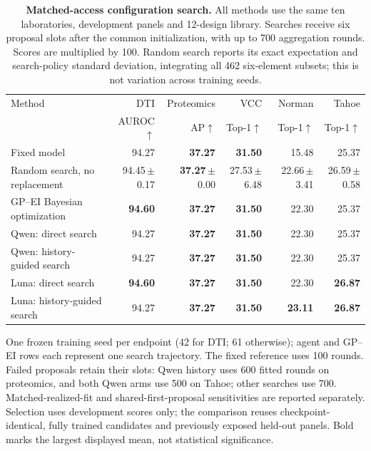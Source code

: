 \begin{table}[t]
\centering
\caption{\textbf{Matched-access configuration search.} All methods use the same ten laboratories, development panels and 12-design library. Searches receive six proposal slots after the common initialization, with up to 700 aggregation rounds. Scores are multiplied by 100. Random search reports its exact expectation and search-policy standard deviation, integrating all 462 six-element subsets; this is not variation across training seeds.}
\label{tab:rebuttal-matched-search}
\small
\setlength{\tabcolsep}{4pt}
\begin{tabular}{lrrrrr}
\toprule
Method & DTI & Proteomics & VCC & Norman & Tahoe \\
 & AUROC$\uparrow$ & AP$\uparrow$ & Top-1$\uparrow$ & Top-1$\uparrow$ & Top-1$\uparrow$ \\
\midrule
Fixed model & 94.27 & \textbf{37.27} & \textbf{31.50} & 15.48 & 25.37 \\
Random search, no replacement & 94.45\,{\scriptsize$\pm$}0.17 & \textbf{37.27}\,{\scriptsize$\pm$}0.00 & 27.53\,{\scriptsize$\pm$}6.48 & 22.66\,{\scriptsize$\pm$}3.41 & 26.59\,{\scriptsize$\pm$}0.58 \\
GP--EI Bayesian optimization & \textbf{94.60} & \textbf{37.27} & \textbf{31.50} & 22.30 & 25.37 \\
Qwen: direct search & 94.27 & \textbf{37.27} & \textbf{31.50} & 22.30 & 25.37 \\
Qwen: history-guided search & 94.27 & \textbf{37.27} & \textbf{31.50} & 22.30 & 25.37 \\
Luna: direct search & \textbf{94.60} & \textbf{37.27} & \textbf{31.50} & 22.30 & \textbf{26.87} \\
Luna: history-guided search & 94.27 & \textbf{37.27} & \textbf{31.50} & \textbf{23.11} & \textbf{26.87} \\
\bottomrule
\end{tabular}
\vspace{2pt}
\begin{minipage}{\linewidth}\footnotesize
One frozen training seed per endpoint (42 for DTI; 61 otherwise); agent and GP--EI rows each represent one search trajectory. The fixed reference uses 100 rounds. Failed proposals retain their slots: Qwen history uses 600 fitted rounds on proteomics, and both Qwen arms use 500 on Tahoe; other searches use 700. Matched-realized-fit and shared-first-proposal sensitivities are reported separately. Selection uses development scores only; the comparison reuses checkpoint-identical, fully trained candidates and previously exposed held-out panels. Bold marks the largest displayed mean, not statistical significance.
\end{minipage}
\end{table}
